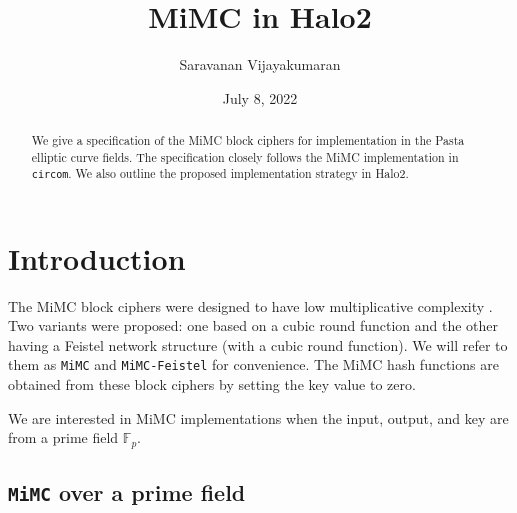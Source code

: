 \documentclass[10pt]{article}
\title{MiMC in Halo2}
\date{July 8, 2022}
\author{Saravanan Vijayakumaran}
\begin{document}
\maketitle
\begin{abstract}
  We give a specification of the MiMC block ciphers for implementation in the Pasta elliptic curve fields. The specification closely follows the MiMC implementation in \texttt{circom}. We also outline the proposed implementation strategy in Halo2.
\end{abstract}
  
\section{Introduction}%
\label{sec:introduction}
The MiMC block ciphers were designed to have low multiplicative complexity \cite{cryptoeprint:2016/492}. Two variants were proposed: one based on a cubic round function and the other having a Feistel network structure (with a cubic round function). We will refer to them as \texttt{MiMC} and \texttt{MiMC-Feistel} for convenience. The MiMC hash functions are obtained from these block ciphers by setting the key value to zero.

We are interested in MiMC implementations when the input, output, and key are from a prime field $\mathbb{F}_p$.
\subsection{\texttt{MiMC} over  a prime field}%
\label{subsec:mimc_over_a_prime_field_}
\end{document}
